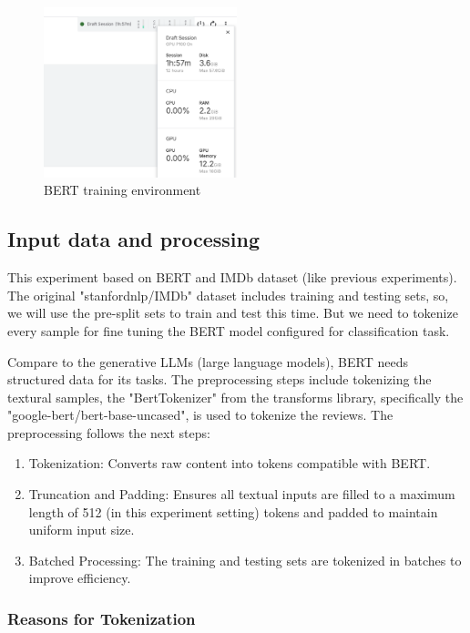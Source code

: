 \begin{figure}[ht]
    \centering
    \includegraphics[width=0.5\textwidth]{pics/bert_consuming.png}
    \caption{BERT training environment}
\end{figure}

\subsection{Input data and processing}
This experiment based on BERT and IMDb dataset (like previous experiments). The original "stanfordnlp/IMDb" dataset includes training and testing sets, so, we will use the pre-split sets to train and test this time. But we need to tokenize every sample for fine tuning the BERT model configured for classification task.

Compare to the generative LLMs (large language models), BERT needs structured data for its tasks.
The preprocessing steps include tokenizing the textural samples, the "BertTokenizer" from the transforms library, specifically the "google-bert/bert-base-uncased", is used to tokenize the reviews. The preprocessing follows the next steps:

\begin{enumerate}
    \item Tokenization: Converts raw content into tokens compatible with BERT.
    \item Truncation and Padding: Ensures all textual inputs are filled to a maximum length of 512 (in this experiment setting) tokens and padded to maintain uniform input size.
    \item Batched Processing: The training and testing sets are tokenized in batches to improve efficiency.
\end{enumerate}

\subsubsection{Reasons for Tokenization}

